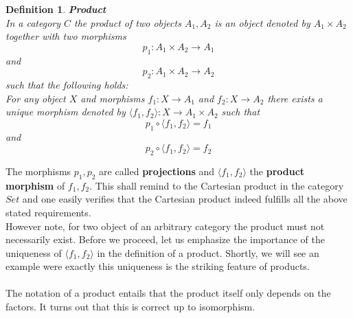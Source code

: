 \documentclass[17pt]{extarticle}
\newtheorem*{definition*}{Definition}
\begin{document}
\begin{definition*}
	\textbf{Product}\\
	In a category $C$ the product of two objects $A_1, A_2$ is an object
	denoted by $A_1\times A_2$ together with two morphisms
	$$p_1:A_1\times A_2\rightarrow A_1$$
	and
	$$p_2:A_1\times A_2\rightarrow A_2$$
	such that the following holds:\\
	For any object $X$ and morphisms $f_1:X\rightarrow A_1$ and $f_2:X\rightarrow A_2$ there exists a unique morphism denoted by $\langle f_1,f_2\rangle:X\rightarrow A_1\times A_2$ such that
	$$
	p_1\circ\langle f_1,f_2\rangle=f_1
	$$
	and
	$$
	p_2\circ\langle f_1,f_2\rangle=f_2
	$$
\end{definition*}
\leavevmode\newline
The morphisms $p_1, p_2$ are called \textbf{projections} and $\langle f_1, f_2\rangle$ the \textbf{product morphism} of $f_1, f_2$. This shall remind to the Cartesian product in the category $Set$ and one easily verifies that the Cartesian product indeed fulfills all the above stated requirements.\\
However note, for two object of an arbitrary category the product must not necessarily exist.
Before we proceed, let us emphasize the importance of the uniqueness of $\langle f_1, f_2 \rangle$ in the definition of a product. Shortly, we will see an example were exactly this uniqueness is the striking feature of products.
\\ \\
The notation of a product entails that the product itself only depends on the factors. It turns out that this is correct up to isomorphism.
\end{document}
